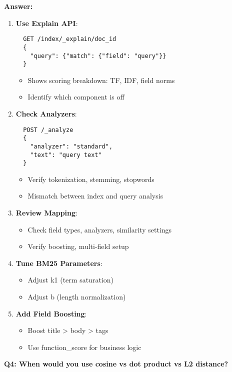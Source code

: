 \documentclass[10pt]{article}
\begin{document}
\textbf{Answer:}
\begin{enumerate}
\item \textbf{Use Explain API}:
  \begin{lstlisting}
  GET /index/_explain/doc_id
  {
    "query": {"match": {"field": "query"}}
  }
  \end{lstlisting}
  \begin{itemize}
  \item Shows scoring breakdown: TF, IDF, field norms
  \item Identify which component is off
  \end{itemize}

\item \textbf{Check Analyzers}:
  \begin{lstlisting}
  POST /_analyze
  {
    "analyzer": "standard",
    "text": "query text"
  }
  \end{lstlisting}
  \begin{itemize}
  \item Verify tokenization, stemming, stopwords
  \item Mismatch between index and query analysis
  \end{itemize}

\item \textbf{Review Mapping}:
  \begin{itemize}
  \item Check field types, analyzers, similarity settings
  \item Verify boosting, multi-field setup
  \end{itemize}

\item \textbf{Tune BM25 Parameters}:
  \begin{itemize}
  \item Adjust k1 (term saturation)
  \item Adjust b (length normalization)
  \end{itemize}

\item \textbf{Add Field Boosting}:
  \begin{itemize}
  \item Boost title > body > tags
  \item Use function\_score for business logic
  \end{itemize}
\end{enumerate}

\textbf{Q4: When would you use cosine vs dot product vs L2 distance?}
\end{document}
